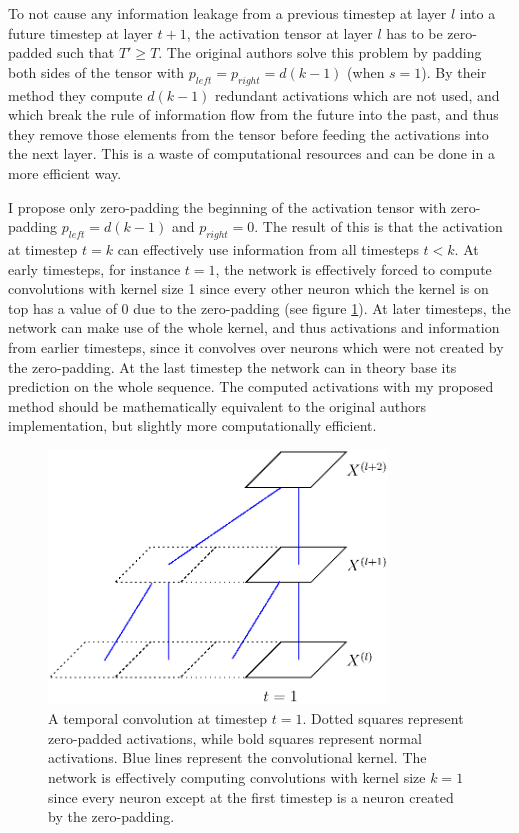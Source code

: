 \documentclass[a4paper, twoside]{article}
\begin{document}
To not cause any information leakage from a previous timestep at layer $l$ into a future timestep at layer $t+1$, the activation tensor at layer $l$ has to be zero-padded such that $T' \geq T$. The original authors \cite{tcn} solve this problem by padding both sides of the tensor with $p_{left} = p_{right} = d(k-1)$ (when $s=1$). By their method they compute $d(k-1)$ redundant activations which are not used, and which break the rule of information flow from the future into the past, and thus they remove those elements from the tensor before feeding the activations into the next layer. This is a waste of computational resources and can be done in a more efficient way.

I propose only zero-padding the beginning of the activation tensor with zero-padding $p_{left} = d(k-1)$ and $p_{right} = 0$. The result of this is that the activation at timestep $t=k$ can effectively use information from all timesteps $t<k$. At early timesteps, for instance $t=1$, the network is effectively forced to compute convolutions with kernel size 1 since every other neuron which the kernel is on top has a value of 0 due to the zero-padding (see figure \ref{figTCNZeropad}). At later timesteps, the network can make use of the whole kernel, and thus activations and information from earlier timesteps, since it convolves over neurons which were not created by the zero-padding. At the last timestep the network can in theory base its prediction on the whole sequence. The computed activations with my proposed method should be mathematically equivalent to the original authors implementation, but slightly more computationally efficient.


\begin{figure}[h]
\begin{center}
    \includegraphics[width=9cm]{figTCNZeropad.eps}\caption{A temporal convolution at timestep $t=1$. Dotted squares represent zero-padded activations, while bold squares represent normal activations. Blue lines represent the convolutional kernel. The network is effectively computing convolutions with kernel size $k=1$ since every neuron except at the first timestep is a neuron created by the zero-padding.}\label{figTCNZeropad}
\end{center}
\end{figure}
\end{document}
